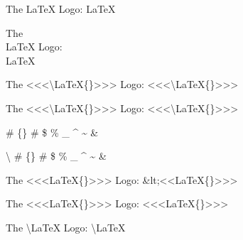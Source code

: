 
The \LaTeX{} Logo: {\mktsStyleCode{}\LaTeX{}}\mktsShowpar\par
The \\LaTeX{} Logo: {\mktsStyleCode{}\\LaTeX{}}\mktsShowpar\par
The <<<\textbackslash{}LaTeX\{\}>>> Logo: {\mktsStyleCode{}<<<\textbackslash{}LaTeX\{\}>>>}\mktsShowpar\par
The <<<\textbackslash{}LaTeX\{\}>>> Logo: {\mktsStyleCode{}<<<\textbackslash{}LaTeX\{\}>>>}\mktsShowpar\par
 \#  \{\} \# \$ \% \_ \textasciicircum{} \textasciitilde{} \&\mktsShowpar\par
{\mktsStyleCode{}\textbackslash{} \#  \{\} \# \$ \% \_ \textasciicircum{} \textasciitilde{} \&}\mktsShowpar\par
The <<<LaTeX\{\}>>> Logo: {\mktsStyleCode{}\&lt;<<LaTeX\{\}>>>}\mktsShowpar\par
The <<<LaTeX\{\}>>> Logo: {\mktsStyleCode{}<<<LaTeX\{\}>>>}\mktsShowpar\par
The \textbackslash{}\LaTeX{} Logo: {\mktsStyleCode{}\textbackslash{}\LaTeX{}}\mktsShowpar\par

